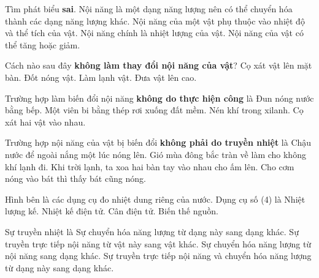 

\begin{ex}
Tìm phát biểu \textbf{sai}.
\choice
{Nội năng là một dạng năng lượng nên có thể chuyển hóa thành các dạng năng lượng khác.}
{Nội năng của một vật phụ thuộc vào nhiệt độ và thể tích của vật.}
{\True Nội năng chính là nhiệt lượng của vật.}
{Nội năng của vật có thể tăng hoặc giảm.}
\end{ex}
\begin{ex}
Cách nào sau đây \textbf{không làm thay đổi nội năng của vật}?
\choice
{Cọ xát vật lên mặt bàn.}
{Đốt nóng vật.}
{Làm lạnh vật.}
{\True Đưa vật lên cao.}
\end{ex}
\begin{ex}
Trường hợp làm biến đổi nội năng \textbf{không do thực hiện công} là
\choice
{\True Đun nóng nước bằng bếp.}
{Một viên bi bằng thép rơi xuống đất mềm.}
{Nén khí trong xilanh.}
{Cọ xát hai vật vào nhau.}
\end{ex}
\begin{ex}
Trường hợp nội năng của vật bị biến đổi \textbf{không phải do truyền nhiệt} là
\choice
{Chậu nước để ngoài nắng một lúc nóng lên.}
{Gió mùa đông bắc tràn về làm cho không khí lạnh đi.}
{\True Khi trời lạnh, ta xoa hai bàn tay vào nhau cho ấm lên.}
{Cho cơm nóng vào bát thì thấy bát cũng nóng.}
\end{ex}
\begin{ex}
Hình bên là các dụng cụ đo nhiệt dung riêng của nước. Dụng cụ số (4) là
\choice
{Nhiệt lượng kế.}
{Nhiệt kế điện tử.}
{Cân điện tử.}
{\True Biến thế nguồn.}
\end{ex}
\begin{ex}
Sự truyền nhiệt là
\choice
{Sự chuyển hóa năng lượng từ dạng này sang dạng khác.}
{\True Sự truyền trực tiếp nội năng từ vật này sang vật khác.}
{Sự chuyển hóa năng lượng từ nội năng sang dạng khác.}
{Sự truyền trực tiếp nội năng và chuyển hóa năng lượng từ dạng này sang dạng khác.}
\end{ex}
